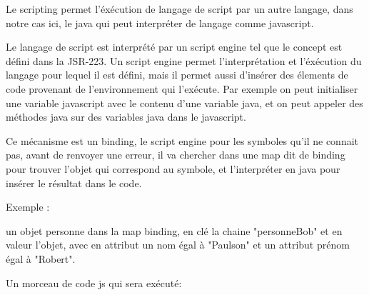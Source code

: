 Le scripting permet l'éxécution de langage de script par un autre langage, dans
notre cas ici, le java qui peut interpréter de langage comme javascript.

Le langage de script est interprété par un script engine tel que le concept est 
défini dans la JSR-223. Un script engine permet l'interprétation et l'éxécution
du langage pour lequel il est défini, mais il permet aussi d'insérer des élements
de code provenant de l'environnement qui l'exécute. Par exemple on peut initialiser
une variable javascript avec le contenu d'une variable java, et on peut appeler 
des méthodes java sur des variables java dans le javascript.

Ce mécanisme est un binding, le script engine pour les symboles qu'il ne connait
pas, avant de renvoyer une erreur, il va chercher dans une map dit de binding 
pour trouver l'objet qui correspond au symbole, et l'interpréter en java pour
insérer le résultat dans le code.

Exemple :

un objet personne dans la map binding, en clé la chaine "personneBob" et en valeur 
l'objet, avec en attribut un nom égal à "Paulson" et un attribut prénom égal à
"Robert".

Un morceau de code js qui sera exécuté:


